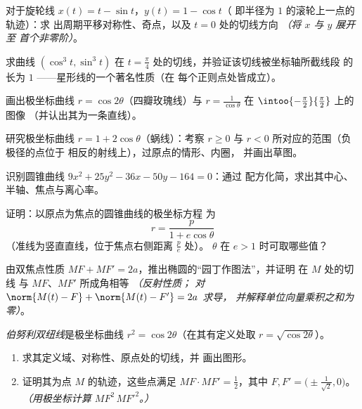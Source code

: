 \begin{exercise}[$\star$]\label{exo:b1:curves:2}
对于旋轮线 $x(t) = t - \sin t$，$y(t) = 1 - \cos t$（
即半径为 $1$ 的滚轮上一点的轨迹）：求
出周期平移对称性、奇点，以及
$t = 0$ 处的切线方向 \emph{（将 $x$ 与 $y$ 展开至
首个非零阶）}。
\end{exercise}

\begin{exercise}[$\star$]\label{exo:b1:curves:3}
求曲线 $(\cos^3 t, \sin^3 t)$ 在 $t =
\frac\pi4$ 处的切线，并验证该切线被坐标轴所截线段
的长为 $1$ ——星形线的一个著名性质（在
每个正则点处皆成立）。
\end{exercise}

\begin{exercise}[$\star$]\label{exo:b1:curves:4}
画出极坐标曲线 $r = \cos 2\theta$（四瓣玫瑰线）与
$r = \frac{1}{\cos\theta}$ 在 $\intoo{-\frac\pi2}{\frac\pi2}$ 上的图像
（并认出其为一条直线）。
\end{exercise}

\begin{exercise}[$\star\star$]\label{exo:b1:curves:5}
研究极坐标曲线 $r = 1 + 2\cos\theta$（蜗线）：考察
$r \geq 0$ 与 $r < 0$ 所对应的范围（负极径的点位于
相反的射线上），过原点的情形、内圈，
并画出草图。
\end{exercise}

\begin{exercise}[$\star\star$]\label{exo:b1:curves:6}
识别圆锥曲线 $9x^2 + 25y^2 - 36x - 50y - 164 = 0$：通过
配方化简，求出其中心、半轴、焦点与离心率。
\end{exercise}

\begin{exercise}[$\star\star$]\label{exo:b1:curves:7}
证明：以原点为焦点的圆锥曲线的极坐标方程
为
\[
r = \frac{p}{1 + e\cos\theta}
\]
（准线为竖直直线，位于焦点右侧距离 $\frac pe$ 处）。
$\theta$ 在 $e > 1$ 时可取哪些值？
\end{exercise}

\begin{exercise}[$\star\star$]\label{exo:b1:curves:8}
由双焦点性质 $MF + MF' = 2a$，推出椭圆的“园丁作图法”，并证明
在 $M$ 处的切线
与 $MF$、$MF'$ 所成角相等 \emph{（反射性质；
对 $\norm{M(t) - F} + \norm{M(t) - F'} = 2a$ 求导，
并解释单位向量乘积之和为零）}。
\end{exercise}

\begin{exercise}[$\star\star\star$]\label{exo:b1:curves:9}
\emph{伯努利双纽线}是极坐标曲线 $r^2 = \cos
2\theta$（在其有定义处取 $r = \sqrt{\cos2\theta}$）。
\begin{enumerate}
  \item 求其定义域、对称性、原点处的切线，并
        画出图形。
  \item 证明其为点 $M$ 的轨迹，这些点满足 $MF \cdot MF'
        = \frac12$，其中 $F, F' = \bigl(\pm\frac{1}{\sqrt2},
        0\bigr)$。\emph{（用极坐标计算
        $MF^2\,MF'^2$。）}
\end{enumerate}
\end{exercise}

